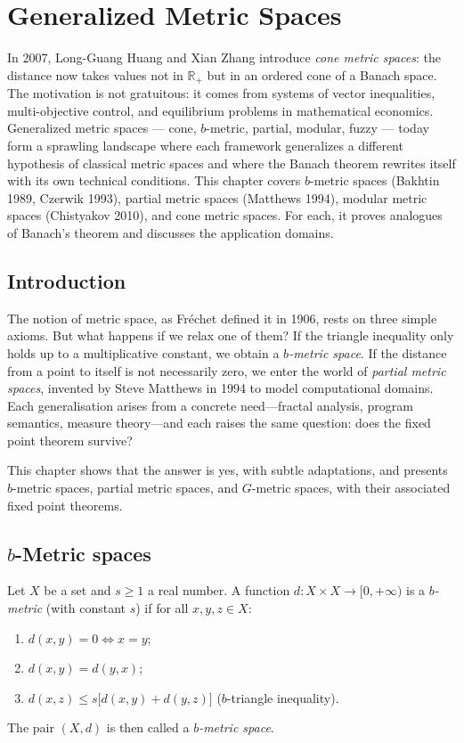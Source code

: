 \chapter{Generalized Metric Spaces}\label{ch:generalized_spaces}

In 2007, Long-Guang Huang and Xian Zhang introduce \emph{cone metric spaces}: the distance now takes values not in $\mathbb{R}_+$ but in an ordered cone of a Banach space. The motivation is not gratuitous: it comes from systems of vector inequalities, multi-objective control, and equilibrium problems in mathematical economics. Generalized metric spaces --- cone, $b$-metric, partial, modular, fuzzy --- today form a sprawling landscape where each framework generalizes a different hypothesis of classical metric spaces and where the Banach theorem rewrites itself with its own technical conditions. This chapter covers $b$-metric spaces (Bakhtin 1989, Czerwik 1993), partial metric spaces (Matthews 1994), modular metric spaces (Chistyakov 2010), and cone metric spaces. For each, it proves analogues of Banach's theorem and discusses the application domains.

\section{Introduction}

The notion of metric space, as Fr\'echet defined it in 1906, rests on three simple axioms. But what happens if we relax one of them? If the triangle inequality only holds up to a multiplicative constant, we obtain a \emph{$b$-metric space}. If the distance from a point to itself is not necessarily zero, we enter the world of \emph{partial metric spaces}, invented by Steve Matthews in 1994 to model computational domains. Each generalisation arises from a concrete need---fractal analysis, program semantics, measure theory---and each raises the same question: does the fixed point theorem survive?

This chapter shows that the answer is yes, with subtle adaptations, and presents $b$-metric spaces,
partial metric spaces, and $G$-metric spaces, with their associated fixed point
theorems.

\section{$b$-Metric spaces}

\begin{definition}
Let $X$ be a set and $s \geq 1$ a real number. A function
$d : X \times X \to [0, +\infty)$ is a \emph{$b$-metric} (with constant $s$)
if for all $x, y, z \in X$:
\begin{enumerate}
    \item $d(x, y) = 0 \Leftrightarrow x = y$;
    \item $d(x, y) = d(y, x)$;
    \item $d(x, z) \leq s \bigl[ d(x, y) + d(y, z) \bigr]$ \quad ($b$-triangle inequality).
\end{enumerate}
The pair $(X, d)$ is then called a \emph{$b$-metric space}.
\end{definition}

